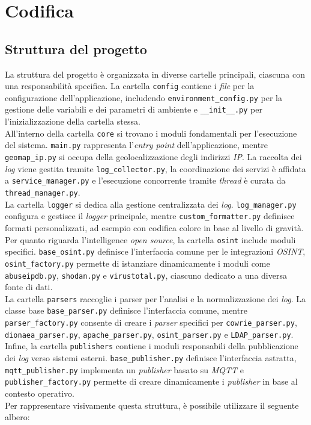 \section{Codifica}
\subsection{Struttura del progetto}
\normalsize
La struttura del progetto è organizzata in diverse cartelle principali, ciascuna con una responsabilità specifica. La cartella \texttt{config} contiene i \textit{file} per la configurazione dell'applicazione, includendo \texttt{environment\_config.py} per la gestione delle variabili e dei parametri di ambiente e \texttt{\_\_init\_\_.py} per l'inizializzazione della cartella stessa.\\
All'interno della cartella \texttt{core} si trovano i moduli fondamentali per l'esecuzione del sistema. \texttt{main.py} rappresenta l'\textit{entry point} dell'applicazione, mentre \texttt{geomap\_ip.py} si occupa della geolocalizzazione degli indirizzi \textit{IP}. La raccolta dei \textit{log} viene gestita tramite \texttt{log\_collector.py}, la coordinazione dei servizi è affidata a \texttt{service\_manager.py} e l'esecuzione concorrente tramite \textit{thread} è curata da \texttt{thread\_manager.py}.\\
La cartella \texttt{logger} si dedica alla gestione centralizzata dei \textit{log}. \texttt{log\_manager.py} configura e gestisce il \textit{logger} principale, mentre \texttt{custom\_formatter.py} definisce formati personalizzati, ad esempio con codifica colore in base al livello di gravità.\\
Per quanto riguarda l'intelligence \textit{open source}, la cartella \texttt{osint} include moduli specifici. \texttt{base\_osint.py} definisce l'interfaccia comune per le integrazioni \textit{OSINT}, \texttt{osint\_factory.py} permette di istanziare dinamicamente i moduli come \texttt{abuseipdb.py}, \texttt{shodan.py} e \texttt{virustotal.py}, ciascuno dedicato a una diversa fonte di dati.\\
La cartella \texttt{parsers} raccoglie i parser per l'analisi e la normalizzazione dei \textit{log}. La classe base \texttt{base\_parser.py} definisce l'interfaccia comune, mentre \texttt{parser\_factory.py} consente di creare i \textit{parser} specifici per \texttt{cowrie\_parser.py}, \texttt{dionaea\_parser.py}, \texttt{apache\_parser.py}, \texttt{osint\_parser.py} e \texttt{LDAP\_parser.py}.\\
Infine, la cartella \texttt{publishers} contiene i moduli responsabili della pubblicazione dei \textit{log} verso sistemi esterni. \texttt{base\_publisher.py} definisce l'interfaccia astratta, \texttt{mqtt\_publisher.py} implementa un \textit{publisher} basato su \textit{MQTT} e \texttt{publisher\_factory.py} permette di creare dinamicamente i \textit{publisher} in base al contesto operativo.\\
Per rappresentare visivamente questa struttura, è possibile utilizzare il seguente albero:\\

